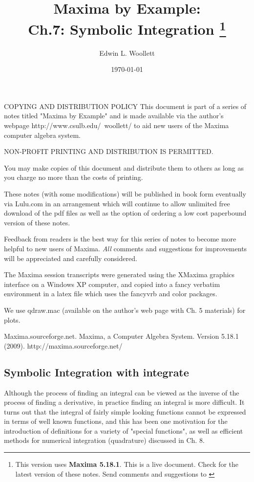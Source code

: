 \documentclass[12pt]{article}
\title{  Maxima by Example:\\ Ch.7: Symbolic Integration 
            \thanks{This version uses \textbf{Maxima 5.18.1}. This is a live
            document. Check \; \textbf{ \tedhome } \; for the latest version of these notes. Send comments and
			 suggestions to \textbf{\tedmail} } }
\author{ Edwin L. Woollett}
\date{\today}
\newcommand{\tcdb}{\textcolor{mdb}}
\newcommand{\tcbr}{\textcolor{BrickRed}}
\begin{document}
\maketitle
\tableofcontents
{}
\newpage
\begin{myVerbatim2} 
COPYING AND DISTRIBUTION POLICY    
This document is part of a series of notes titled
"Maxima by Example" and is made available
via the author's webpage http://www.csulb.edu/~woollett/
to aid new users of the Maxima computer algebra system.	
	
NON-PROFIT PRINTING AND DISTRIBUTION IS PERMITTED.
	
You may make copies of this document and distribute them
to others as long as you charge no more than the costs of printing.	

These notes (with some modifications) will be published in book form
eventually via Lulu.com in an arrangement which will continue
to allow unlimited free download of the pdf files as well as the option
of ordering a low cost paperbound version of these notes.
\end{myVerbatim2}	
\smallskip
\noindent \tcbr{Feedback from readers is the best way for this series of notes
  to become more helpful to new users of Maxima}.
\tcdb{\emph{All} comments and suggestions for improvements will be appreciated and
  carefully considered}.
\smallskip
\begin{myVerbatim2s}
The Maxima session transcripts were generated using the XMaxima 
graphics interface on a Windows XP computer, and copied into 
a fancy verbatim environment in a latex file which uses the
fancyvrb and color packages.

We use qdraw.mac (available on the author's web page with Ch. 5 materials)
for plots.
\end{myVerbatim2s}  
\smallskip
\begin{myVerbatim}
Maxima.sourceforge.net. Maxima, a Computer Algebra System. Version 5.18.1
 (2009). http://maxima.sourceforge.net/
\end{myVerbatim}
\newpage
\setcounter{section}{7}
\subsection{Symbolic Integration with \textbf{integrate}}
Although the process of finding an integral can be viewed as
  the inverse of the process of finding a derivative, in practice
  finding an integral is more difficult.
It turns out that the integral of fairly simple looking functions cannot
  be expressed in terms of well known functions, and this has been
  one motivation for the introduction of definitions for a variety of "special functions",
  as well as efficient methods for numerical integration (quadrature) discussed in Ch. 8.\\    
  
\end{document}
